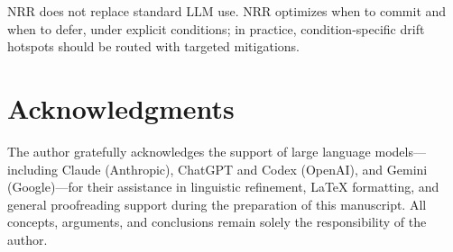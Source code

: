 \documentclass[11pt,a4paper]{article}
\begin{document}
NRR does not replace standard LLM use. NRR optimizes when to commit and when to
defer, under explicit conditions; in practice, condition-specific drift hotspots
should be routed with targeted mitigations.

\section*{Acknowledgments}

The author gratefully acknowledges the support of large language 
models---including Claude (Anthropic), ChatGPT and Codex (OpenAI), and 
Gemini (Google)---for their assistance in linguistic refinement, 
LaTeX formatting, and general proofreading support during the 
preparation of this manuscript.
All concepts, arguments, and conclusions remain solely the 
responsibility of the author.
\end{document}

